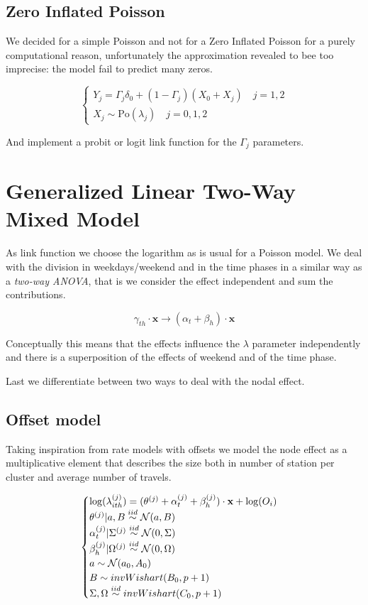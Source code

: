 \documentclass[11pt,twoside]{report}
\begin{document}
\subsection{Zero Inflated Poisson}
We decided for a simple Poisson and not for a Zero Inflated Poisson for a purely computational reason, unfortunately the approximation revealed to bee too imprecise: the model fail to predict many zeros.

\begin{equation}
\begin{cases}
Y_j = \Gamma_j\delta_0 + (1-\Gamma_j)(X_0 + X_j) \quad j = 1,2\\
X_j \sim \mathrm{Po}(\lambda_j) \quad j = 0,1,2 
\end{cases}
\end{equation}

And implement a probit or logit link function for the $\Gamma_j$ parameters.

\section{Generalized Linear Two-Way Mixed Model}
As link function we choose the logarithm as is usual for a Poisson model. We deal with the division in weekdays/weekend and in the time phases in a similar way as a \emph{two-way ANOVA}, that is we consider the effect independent and sum the contributions. 

$$\gamma_{th}\cdot\mathbf{x} \rightarrow (\alpha_{t} + \beta_{h})\cdot\mathbf{x}$$

Conceptually this means that the effects influence the $\lambda$ parameter independently and there is a superposition of the effects of weekend and of the time phase.

Last we differentiate between two ways to deal with the nodal effect. 

\subsection{Offset model}
Taking inspiration from rate models with offsets we model the node effect as a multiplicative element that describes the size both in number of station per cluster and average number of travels. %

\begin{equation}
\begin{cases}
\log(\lambda^{(j)}_{ith}) = (\boldmath{\theta^{(j)} +  \alpha^{(j)}_{t} + \beta_{h}^{(j)})}\cdot\mathbf{x} + \log(O_i)\\
\theta^{(j)}|a,B \stackrel{iid}{\sim} \mathcal{N}(a,B)\\
\alpha_{t}^{(j)}|\Sigma^{(j)} \stackrel{iid}{\sim} \mathcal{N}(0, \Sigma)\\
\beta_{h}^{(j)}|\Omega^{(j)} \stackrel{iid}{\sim} \mathcal{N}(0, \Omega)\\
a \sim \mathcal{N}(a_0, A_0)\\
B \sim invWishart(B_0, p+1)\\
\Sigma, \Omega \stackrel{iid}{\sim} invWishart(C_0, p+1)

\end{cases}
\end{equation}
\end{document}
